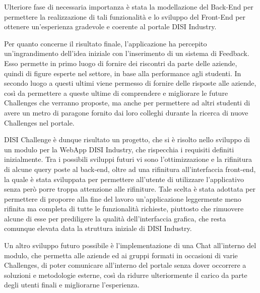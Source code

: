 Ulteriore fase di necessaria importanza è stata la modellazione del Back-End per permettere la realizzazione di tali funzionalità e lo sviluppo del Front-End per ottenere un'esperienza gradevole e coerente al portale DISI Industry.

Per quanto concerne il risultato finale, l'applicazione ha percepito un'ingrandimento dell'idea iniziale con l'inserimento di un sistema di Feedback. Esso permette in primo luogo di fornire dei riscontri da parte delle aziende, quindi di figure esperte nel settore, in base alla performance agli studenti. In secondo luogo a questi ultimi viene permesso di fornire delle risposte alle aziende, così da permettere a queste ultime di comprendere e migliorare le future Challenges che verranno proposte, ma anche per permettere ad altri studenti di avere un metro di paragone fornito dai loro colleghi durante la ricerca di nuove Challenges nel portale.

DISI Challenge è dunque risultato un progetto, che si è risolto nello sviluppo di un modulo per la WebApp DISI Industry, che rispecchia i requisiti definiti inizialmente. Tra i possibili sviluppi futuri vi sono l'ottimizzazione e la rifinitura di alcune query poste al back-end, oltre ad una rifinitura all'interfaccia front-end, la quale è stata sviluppata per permettere all'utente di utilizzare l'applicativo senza però porre troppa attenzione alle rifiniture. Tale scelta è stata adottata per permettere di proporre alla fine del lavoro un'applicazione leggermente meno rifinita ma completa di tutte le funzionalità richieste, piuttosto che rimuovere alcune di esse per prediligere la qualità dell'interfaccia grafica, che resta comunque elevata data la struttura iniziale di DISI Industry.

Un altro sviluppo futuro possibile è l'implementazione di una Chat all'interno del modulo, che permetta alle aziende ed ai gruppi formati in occasioni di varie Challenges, di poter comunicare all'interno del portale senza dover occorrere a soluzioni e metodologie esterne, così da ridurre ulteriormente il carico da parte degli utenti finali e migliorarne l'esperienza.
